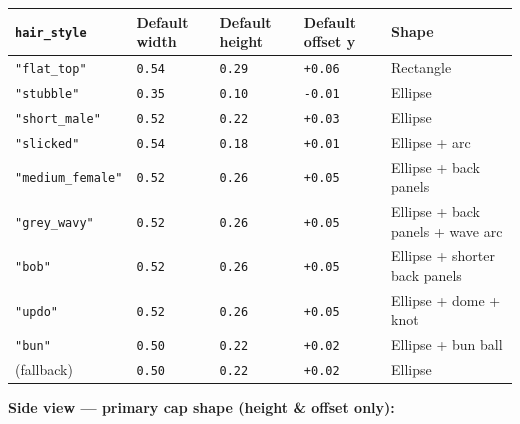 \documentclass[
  12pt,
  letterpaper,
]{book}
\begin{document}
\begin{longtable}[]{@{}
  >{\raggedright\arraybackslash}p{}
  >{\raggedright\arraybackslash}p{}
  >{\raggedright\arraybackslash}p{}
  >{\raggedright\arraybackslash}p{}
  >{\raggedright\arraybackslash}p{}@{}}
\toprule\noalign{}
\texttt{hair\_style} & Default width & Default height & Default offset y
& Shape \\
\midrule\noalign{}
\endhead
\bottomrule\noalign{}
\endlastfoot
\texttt{"flat\_top"} & \texttt{0.54} & \texttt{0.29} & \texttt{+0.06} &
Rectangle \\
\texttt{"stubble"} & \texttt{0.35} & \texttt{0.10} & \texttt{-0.01} &
Ellipse \\
\texttt{"short\_male"} & \texttt{0.52} & \texttt{0.22} & \texttt{+0.03} &
Ellipse \\
\texttt{"slicked"} & \texttt{0.54} & \texttt{0.18} & \texttt{+0.01} &
Ellipse + arc \\
\texttt{"medium\_female"} & \texttt{0.52} & \texttt{0.26} & \texttt{+0.05}
& Ellipse + back panels \\
\texttt{"grey\_wavy"} & \texttt{0.52} & \texttt{0.26} & \texttt{+0.05} &
Ellipse + back panels + wave arc \\
\texttt{"bob"} & \texttt{0.52} & \texttt{0.26} & \texttt{+0.05} &
Ellipse + shorter back panels \\
\texttt{"updo"} & \texttt{0.52} & \texttt{0.26} & \texttt{+0.05} &
Ellipse + dome + knot \\
\texttt{"bun"} & \texttt{0.50} & \texttt{0.22} & \texttt{+0.02} &
Ellipse + bun ball \\
(fallback) & \texttt{0.50} & \texttt{0.22} & \texttt{+0.02} & Ellipse \\
\end{longtable}

\textbf{Side view --- primary cap shape (height \& offset only):}
\end{document}
